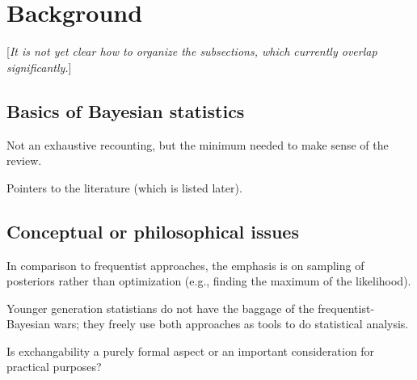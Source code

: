 \section{Background}  \label{sec:background}

[\emph{It is not yet clear how to organize the subsections, which currently overlap
  significantly.}]



\subsection{Basics of Bayesian statistics}  \label{subsec:basic_Bayes}

\bi
  \I Not an exhaustive recounting, but the minimum needed to make sense of
    the review.

  \I Pointers to the literature (which is listed later).
\ei


\subsection{Conceptual or philosophical issues} \label{subsec:conceptual_issues}

\bi
  \I In comparison to frequentist approaches, the emphasis is on sampling of posteriors
    rather than optimization (e.g., finding the maximum of the likelihood).

  \I Younger generation statistians do not have the baggage of the frequentist-Bayesian wars;
    they freely use both approaches as tools to do statistical analysis. 

  \I Is exchangability a purely formal aspect or an important consideration for practical
    purposes? 
\ei



